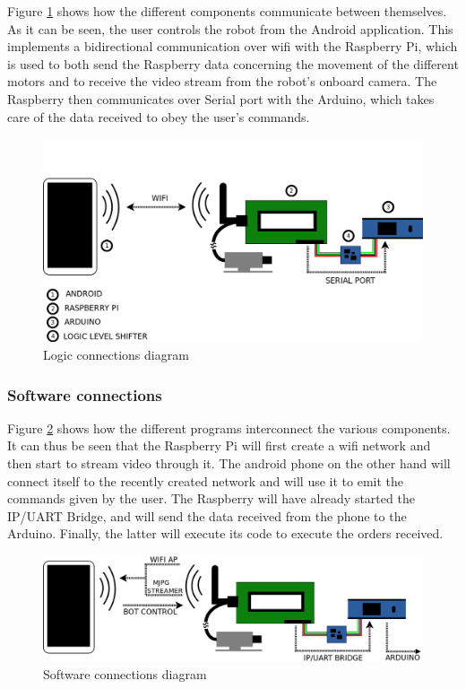 Figure \ref{logicDiagram} shows how the different components communicate between themselves. As it can be seen, the user controls the robot from the Android application. This implements a bidirectional communication over wifi with the Raspberry Pi, which is used to both send the Raspberry data concerning the movement of the different motors and to receive the video stream from the robot's onboard camera. The Raspberry then communicates over Serial port with the Arduino, which takes care of the data received to obey the user's commands.\\

	\begin{figure}[H]
			\centering
			\includegraphics[width=15cm, angle=0]{images/Diagrams/logic.png}
			\caption{Logic connections diagram }
			\label{logicDiagram}
	\end{figure}
	\bigskip


\subsubsection{Software connections}

Figure \ref{swDiagram} shows how the different programs interconnect the various components. It can thus be seen that the Raspberry Pi will first create a wifi network and then start to stream video through it. The android phone on the other hand will connect itself to the recently created network and will use it to emit the commands given by the user. The Raspberry will have already started the IP/UART Bridge, and will send the data received from the phone to the Arduino. Finally, the latter will execute its code to execute the orders received.\\

	\begin{figure}[H]
			\centering
			\includegraphics[width=15cm, angle=0]{images/Diagrams/software.png}
			\caption{Software connections diagram }
			\label{swDiagram}
	\end{figure}
	\bigskip

